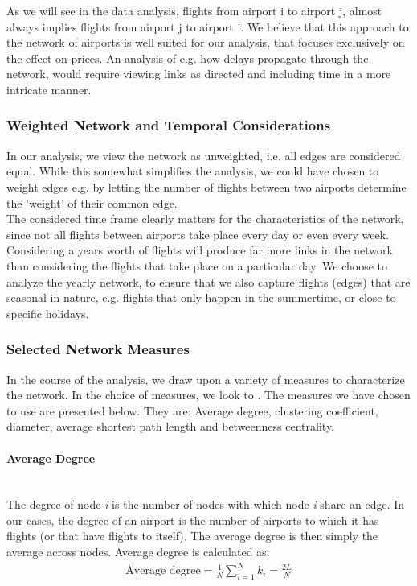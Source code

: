 As we will see in the data analysis, flights from airport i to airport j, almost always implies flights from airport j to airport i. We believe that this approach to the network of airports is well suited for our analysis, that focuses exclusively on the effect on prices. An analysis of e.g. how delays propagate through the network, would require viewing links as directed and including time in a more intricate manner.

\subsubsection{Weighted Network and Temporal Considerations}
In our analysis, we view the network as unweighted, i.e. all edges are considered equal. While this somewhat simplifies the analysis, we could have chosen to weight edges e.g. by letting the number of flights between two airports determine the 'weight' of their common edge. 
\medskip \\
The considered time frame clearly matters for the characteristics of the network, since not all flights between airports take place every day or even every week. Considering a years worth of flights will produce far more links in the network than considering the flights that take place on a particular day. We choose to analyze the yearly network, to ensure that we also capture flights (edges) that are seasonal in nature, e.g. flights that only happen in the summertime, or close to specific holidays. 

\subsubsection{Selected Network Measures}
In the course of the analysis, we draw upon a variety of measures to characterize the network. In the choice of measures, we look to \citet{chi2004structural}. The measures we have chosen to use are presented below. They are: Average degree, clustering coefficient, diameter, average shortest path length and betweenness centrality.

\paragraph{Average Degree}\mbox{} \\
The degree of node \textit{i} is the number of nodes with which node \textit{i} share an edge. In our cases, the degree of an airport is the number of airports to which it has flights (or that have flights to itself). 
The average degree is then simply the average across nodes. Average degree is calculated as: 
\begin{align}
    \text{Average degree} = \frac{1}{N} \sum_{i = 1}^N k_i = \frac{2L}{N}
\end{align}

